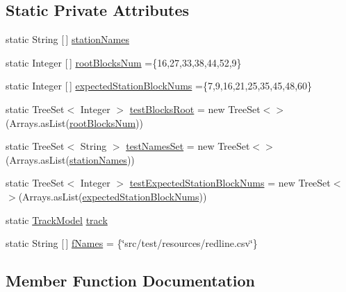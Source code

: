 \subsection*{Static Private Attributes}
\begin{DoxyCompactItemize}
\item 
static String \mbox{[}$\,$\mbox{]} \hyperlink{classTrackModelTest_1_1RedlineTest_af522bafd02e8cc4d845420fd692d3d9b}{station\+Names}
\item 
static Integer \mbox{[}$\,$\mbox{]} \hyperlink{classTrackModelTest_1_1RedlineTest_af6c0d104a6e4c99a443aa92e20b1bc1c}{root\+Blocks\+Num} =\{16,27,33,38,44,52,9\}
\item 
static Integer \mbox{[}$\,$\mbox{]} \hyperlink{classTrackModelTest_1_1RedlineTest_a15b5dcba3d2f7800a07015dfa3a3c015}{expected\+Station\+Block\+Nums} =\{7,9,16,21,25,35,45,48,60\}
\item 
static Tree\+Set$<$ Integer $>$ \hyperlink{classTrackModelTest_1_1RedlineTest_a1e7bd5c2798ce063604fc6738103b5e0}{test\+Blocks\+Root} = new Tree\+Set$<$$>$(Arrays.\+as\+List(\hyperlink{classTrackModelTest_1_1RedlineTest_af6c0d104a6e4c99a443aa92e20b1bc1c}{root\+Blocks\+Num}))
\item 
static Tree\+Set$<$ String $>$ \hyperlink{classTrackModelTest_1_1RedlineTest_a587f6d52dfee441de79812fededfa84b}{test\+Names\+Set} = new Tree\+Set$<$$>$(Arrays.\+as\+List(\hyperlink{classTrackModelTest_1_1RedlineTest_af522bafd02e8cc4d845420fd692d3d9b}{station\+Names}))
\item 
static Tree\+Set$<$ Integer $>$ \hyperlink{classTrackModelTest_1_1RedlineTest_a8a94587a81798044a60016e29a09cd72}{test\+Expected\+Station\+Block\+Nums} = new Tree\+Set$<$$>$(Arrays.\+as\+List(\hyperlink{classTrackModelTest_1_1RedlineTest_a15b5dcba3d2f7800a07015dfa3a3c015}{expected\+Station\+Block\+Nums}))
\item 
static \hyperlink{classTrackModel_1_1TrackModel}{Track\+Model} \hyperlink{classTrackModelTest_1_1RedlineTest_afbab32bc166ca48e7544b8c3908f95e3}{track}
\item 
static String \mbox{[}$\,$\mbox{]} \hyperlink{classTrackModelTest_1_1RedlineTest_a9a9887d39f3d19ee5daf4de70339ba33}{f\+Names} = \{\char`\"{}src/test/resources/redline.\+csv\char`\"{}\}
\end{DoxyCompactItemize}


\subsection{Member Function Documentation}
\mbox{\label{classTrackModelTest_1_1RedlineTest_a497f6628deb6bfcdacf364347d91a047}} 
